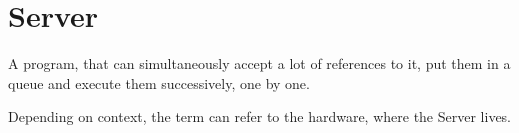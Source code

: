 \section{Server}
\label{sec:Server}

A program, that can simultaneously accept a lot of references to it, put them in a queue and execute them successively, one by one.

Depending on context, the term can refer to the hardware, where the Server lives.